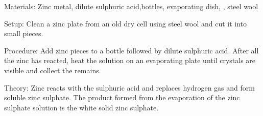 \begin{multicols}{2}
\begin{description*}
\item[Materials:]{Zinc metal, dilute sulphuric acid,bottles, evaporating dish, , steel wool}
\item[Setup:]{Clean a zinc plate from an old dry cell using steel wool and cut it into small pieces.}
\item[Procedure:]{Add zinc pieces to a bottle followed by dilute sulphuric acid. After all the zinc has reacted, heat the solution on an evaporating plate until crystals are visible and collect the remains.}
\item[Theory:]{Zinc reacts with the sulphuric acid and replaces hydrogen gas and form soluble zinc sulphate. The product formed from the evaporation of the zinc
sulphate solution is the white solid zinc sulphate.}
\end{description*}


\end{multicols}

\vfill
\pagebreak